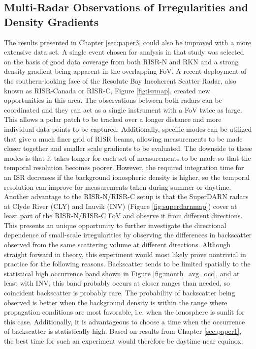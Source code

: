 \subsection{Multi-Radar Observations of Irregularities and Density Gradients}
\label{sec:fw_multiradar}
The results presented in Chapter \ref{sec:paper3} could also be improved with a more extensive data set.  A single event chosen for analysis in that study was selected on the basis of good data coverage from both RISR-N and RKN and a strong density gradient being apparent in the overlapping FoV.  A recent deployment of the southern-looking face of the Resolute Bay Incoherent Scatter Radar, also known as RISR-Canada or RISR-C, Figure \ref{fig:isrmap}, created new opportunities in this area.  The observations between both radars can be coordinated and they can act as a single instrument with a FoV twice as large.  This allows a polar patch to be tracked over a longer distance and more individual data points to be captured.  Additionally, specific modes can be utilized that give a much finer grid of RISR beams, allowing measurements to be made closer together and smaller scale gradients to be evaluated.  The downside to these modes is that it takes longer for each set of measurements to be made so that the temporal resolution becomes poorer.  However, the required integration time for an ISR decreases if the background ionospheric density is higher, so the temporal resolution can improve for measurements taken during summer or daytime.  Another advantage to the RISR-N/RISR-C setup is that the SuperDARN radars at Clyde River (CLY) and Inuvik (INV) (Figure \ref{fig:superdarnmap}) cover at least part of the RISR-N/RISR-C FoV and observe it from different directions.  This presents an unique opportunity to further investigate the directional dependence of small-scale irregularities by observing the differences in backscatter observed from the same scattering volume at different directions.  Although straight forward in theory, this experiment would most likely prove nontrivial in practice for the following reasons.  Backscatter tends to be limited spatially to the statistical high occurrence band shown in Figure \ref{fig:month_avg_occ}, and at least with INV, this band probably occurs at closer ranges than needed, so coincident backscatter is probably rare.  The probability of backscatter being observed is better when the background density is within the range where propagation conditions are most favorable, i.e. when the ionosphere is sunlit for this case.  Additionally, it is advantageous to choose a time when the occurrence of backscatter is statistically high.  Based on results from Chapter \ref{sec:paper1}, the best time for such an experiment would therefore be daytime near equinox.

